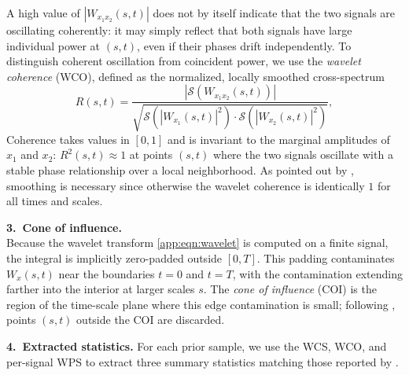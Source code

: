 A high value of $|W_{x_1 x_2}(s, t)|$ does not by itself indicate that the two signals are oscillating coherently: it may simply reflect that both signals have large individual power at $(s, t)$, even if their phases drift independently. To distinguish coherent oscillation from coincident power, we use the \emph{wavelet coherence} (WCO), defined as the normalized, locally smoothed cross-spectrum
\begin{equation}\label{app:eqn:coherence}
    R(s, t) = \frac{\left| \mathcal{S}\left( W_{x_1 x_2}(s, t) \right) \right|}{\sqrt{\mathcal{S}\left(|W_{x_1}(s, t)|^2 \right) \cdot \mathcal{S}\left( |W_{x_2}(s, t)|^2 \right)}},
\end{equation}
Coherence takes values in $[0, 1]$ and is invariant to the marginal amplitudes of $x_1$ and $x_2$: $R^2(s, t) \approx 1$ at points $(s, t)$ where the two signals oscillate with a stable phase relationship over a local neighborhood.
As pointed out by \citet{torrence1998practical}, smoothing is necessary since otherwise the wavelet coherence is identically $1$ for all times and scales.

\textbf{3.~Cone of influence.}\\
Because the wavelet transform \cref{app:eqn:wavelet} is computed on a finite signal, the integral is implicitly zero-padded outside $[0, T]$. This padding contaminates $W_x(s, t)$ near the boundaries $t = 0$ and $t = T$, with the contamination extending farther into the interior at larger scales $s$. The \emph{cone of influence} (COI) is the region of the time-scale plane where this edge contamination is small; following \citet{torrence1998practical}, points $(s, t)$ outside the COI are discarded.
 
\textbf{4.~Extracted statistics.}
For each prior sample, we use the WCS, WCO, and per-signal WPS to extract three summary statistics matching those reported by \citet{blasius2020long}.

